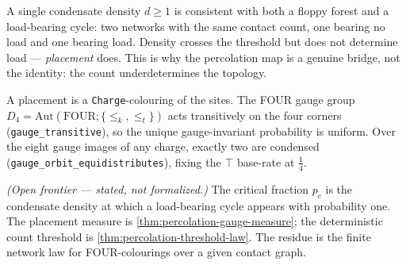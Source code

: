 \begin{theorem}\label{thm:percolation-density-not-sufficient}\leanok{}
A single condensate density $d \ge 1$ is consistent with both a floppy forest and a load-bearing
cycle: two networks with the same contact count, one bearing no load and one bearing load. Density
crosses the threshold but does not determine load --- \emph{placement} does. This is why the
percolation map is a genuine bridge, not the identity: the count underdetermines the topology.
\end{theorem}

\begin{theorem}\label{thm:percolation-gauge-measure}\leanok{}
A placement is a \texttt{Charge}-colouring of the sites.  The FOUR gauge group
$D_4=\mathrm{Aut}(\text{FOUR};\{\le_k,\le_t\})$ acts transitively on the four
corners (\texttt{gauge\_transitive}), so the unique gauge-invariant probability is
uniform.  Over the eight gauge images of any charge, exactly two are condensed
(\texttt{gauge\_orbit\_equidistributes}), fixing the $\top$ base-rate at
$\tfrac14$.
\end{theorem}

\begin{theorem}\label{thm:percolation-critical-fraction}\notready{}
\emph{(Open frontier --- stated, not formalized.)} The critical fraction $p_c$ is
the condensate density at which a load-bearing cycle appears with probability
one.  The placement measure is \cref{thm:percolation-gauge-measure}; the
deterministic count threshold is \cref{thm:percolation-threshold-law}.  The
residue is the finite network law for FOUR-colourings over a given contact graph.
\end{theorem}
